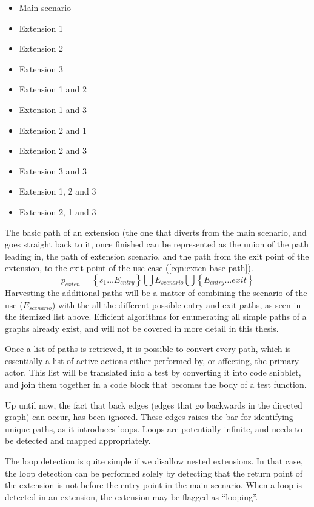 \begin{itemize}
  \item Main scenario
  \item Extension 1
  \item Extension 2
  \item Extension 3
  \item Extension 1 and 2
  \item Extension 1 and 3  
  \item Extension 2 and 1
  \item Extension 2 and 3  
  \item Extension 3 and 3
  \item Extension 1, 2 and 3
  \item Extension 2, 1 and 3
\end{itemize}
\noindent The basic path of an extension (the one that diverts from the main scenario, and goes straight back to it, once finished can be represented as the union of the path leading in, the path of extension scenario, and the path from the exit point of the extension, to the exit point of the use case (\ref{eqn:exten-base-path}). 
\begin{equation}
p_{exten} = \left\lbrace s_1 \dots E_{entry} \right\rbrace \bigcup E_{scenario} \bigcup \left\lbrace E_{entry} \dots exit \right\rbrace
\label{eqn:exten-base-path}
\end{equation}
\noindent Harvesting the additional paths will be a matter of combining the scenario of the use ($E_{scenario}$) with the all the different possible entry and exit paths, as seen in the itemized list above. Efficient algorithms for enumerating all simple paths of a graphs already exist\cite{rubin1978enumerating}, and will not be covered in more detail in this thesis.\bigskip

\noindent Once a list of paths is retrieved, it is possible to convert every path, which is essentially a list of active actions either performed by, or affecting, the primary actor. This list will be translated into a test by converting it into code snibblet, and join them together in a code block that becomes the body of a test function.\bigskip

\noindent Up until now, the fact that back edges (edges that go backwards in the directed graph) can occur, has been ignored. These edges raises the bar for identifying unique paths, as it introduces loops. Loops are potentially infinite, and needs to be detected and mapped appropriately.\bigskip

\noindent The loop detection is quite simple if we disallow nested extensions. In that case, the loop detection can be performed solely by detecting that the return point of the extension is not before the entry point in the main scenario. When a loop is detected in an extension, the extension may be flagged as ``looping''.\bigskip

